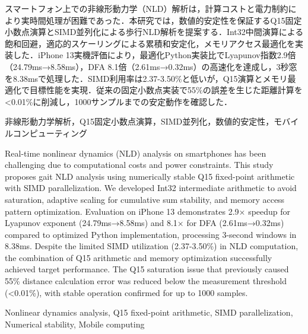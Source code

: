 \documentclass[paper]{ieicej}
\begin{document}
\begin{jabstract}
スマートフォン上での非線形動力学（NLD）解析は，計算コストと電力制約により実時間処理が困難であった．本研究では，数値的安定性を保証するQ15固定小数点演算とSIMD並列化による歩行NLD解析を提案する．Int32中間演算による飽和回避，適応的スケーリングによる累積和安定化，メモリアクセス最適化を実装した．iPhone 13実機評価により，最適化Python実装比でLyapunov指数2.9倍（24.79ms→8.58ms），DFA 8.1倍（2.61ms→0.32ms）の高速化を達成し，3秒窓を8.38msで処理した．SIMD利用率は2.37-3.50\%と低いが，Q15演算とメモリ最適化で目標性能を実現．従来の固定小数点実装で55\%の誤差を生じた距離計算を<0.01\%に削減し，1000サンプルまでの安定動作を確認した．
\end{jabstract}

\begin{jkeyword}
非線形動力学解析，Q15固定小数点演算，SIMD並列化，数値的安定性，モバイルコンピューティング
\end{jkeyword}

\begin{eabstract}
Real-time nonlinear dynamics (NLD) analysis on smartphones has been challenging due to computational costs and power constraints. This study proposes gait NLD analysis using numerically stable Q15 fixed-point arithmetic with SIMD parallelization. We developed Int32 intermediate arithmetic to avoid saturation, adaptive scaling for cumulative sum stability, and memory access pattern optimization. Evaluation on iPhone 13 demonstrates 2.9× speedup for Lyapunov exponent (24.79ms→8.58ms) and 8.1× for DFA (2.61ms→0.32ms) compared to optimized Python implementation, processing 3-second windows in 8.38ms. Despite the limited SIMD utilization (2.37-3.50\%) in NLD computation, the combination of Q15 arithmetic and memory optimization successfully achieved target performance. The Q15 saturation issue that previously caused 55\% distance calculation error was reduced below the measurement threshold (<0.01\%), with stable operation confirmed for up to 1000 samples.
\end{eabstract}

\begin{ekeyword}
Nonlinear dynamics analysis, Q15 fixed-point arithmetic, SIMD parallelization, Numerical stability, Mobile computing
\end{ekeyword}

\maketitle
\end{document}
